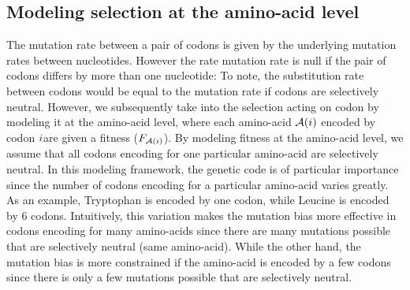 \subsection{Modeling selection at the amino-acid level}
\label{sec-mut-bias:aa-selection}
The mutation rate between a pair of \glspl{codon} is given by the underlying mutation rates between nucleotides.
However the rate mutation rate is null if the pair of \glspl{codon} differs by more than one nucleotide:
To note, the \gls{substitution} rate between \glspl{codon} would be equal to the mutation rate if \glspl{codon} are selectively \gls{neutral}.
However, we subsequently take into the selection acting on \gls{codon} by modeling it at the amino-acid level, where each amino-acid $\mathcal{A}({i})$ encoded by \gls{codon} ${i} $are given a fitness ($F_{\mathcal{A}({i})}$).
By modeling fitness at the amino-acid level, we assume that all \glspl{codon} encoding for one particular amino-acid are selectively \gls{neutral}.
In this modeling framework, the genetic code is of particular importance since the number of \glspl{codon} encoding for a particular amino-acid varies greatly.
As an example, Tryptophan is encoded by one \gls{codon}, while Leucine is encoded by 6 \glspl{codon}.
Intuitively, this variation makes the mutation bias more effective in \glspl{codon} encoding for many amino-acids since there are many mutations possible that are selectively \gls{neutral} (same amino-acid).
While the other hand, the mutation bias is more constrained if the amino-acid is encoded by a few \glspl{codon} since there is only a few mutations possible that are selectively \gls{neutral}.\\


